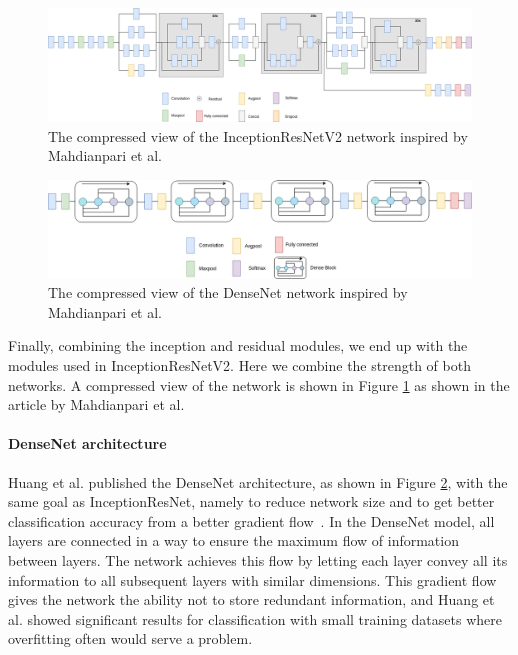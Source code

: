\begin{figure}
     \centering
     \includegraphics[width=1\textwidth]{methodology/figures/Schematic-diagram-of-InceptionResNetV2.png}
     \caption{The compressed view of the InceptionResNetV2 network inspired by Mahdianpari et al.}
     \label{fig:IRV2}
\end{figure}
\begin{figure}
     \centering
     \includegraphics[width=1\textwidth]{methodology/figures/Schematic-diagram-of-DenseNet-model.png}
     \caption{The compressed view of the DenseNet network inspired by Mahdianpari et al.}
     \label{fig:DN}
\end{figure}

Finally, combining the inception and residual modules, we end up with the modules used in InceptionResNetV2. 
Here we combine the strength of both networks. A compressed view of the network is shown in Figure \ref{fig:IRV2} as shown in the article by Mahdianpari et al.~\cite{rs10071119}


\paragraph{DenseNet architecture}
Huang et al. published the DenseNet architecture, as shown in Figure \ref{fig:DN}, with the same goal as InceptionResNet, namely to reduce network size and to get better classification accuracy from a better gradient flow~\cite{Huang_2017}.
In the DenseNet model, all layers are connected in a way to ensure the maximum flow of information between layers. The network achieves this flow by letting each layer convey all its information to all subsequent layers with similar dimensions. This gradient flow gives the network the ability not to store redundant information, and Huang et al. showed significant results for classification with small training datasets where overfitting often would serve a problem.



